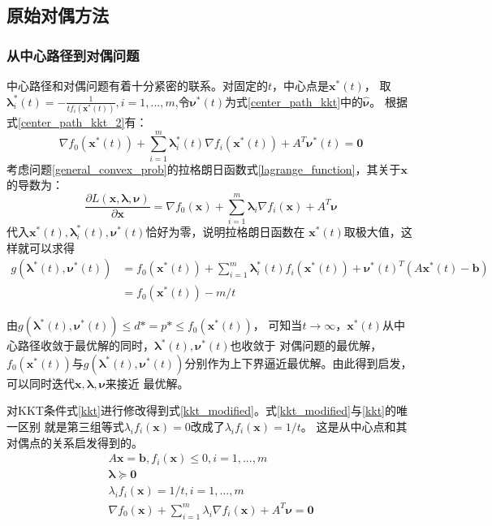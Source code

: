 \documentclass{article}
\begin{document}
\subsection{原始对偶方法}
\subsubsection{从中心路径到对偶问题}
\label{center_to_dual}
中心路径和对偶问题有着十分紧密的联系。对固定的$t$，中心点是$\bm x^*(t)$，
取$\bm\lambda_i^*(t)=-\frac{1}{tf_i(\bm x^*(t))},i=1,...,m$,令$\bm \nu^*(t)$为式\eqref{center_path_kkt}中的$\widehat{\bm\nu}$。
根据式\eqref{center_path_kkt_2}有：
$$\nabla f_0(\bm x^*(t))+\sum_{i=1}^m{\bm\lambda_i^*(t)\nabla f_i(\bm x^*(t))}+A^T\bm \nu^*(t)=\bm 0$$
考虑问题\ref{general_convex_prob}的拉格朗日函数式\eqref{lagrange_function}，其关于$\bm x$的导数为：
$$\frac{\partial L(\bm x,\bm \lambda,\bm \nu)}{\partial\bm x}=
\nabla f_0(\bm x)+\sum_{i=1}^m{\bm\lambda_i\nabla f_i(\bm x)}+A^T\bm\nu$$
代入$\bm x^*(t),\bm\lambda_i^*(t),\bm\nu^*(t)$恰好为零，说明拉格朗日函数在
$\bm x^*(t)$取极大值，这样就可以求得
\begin{equation}
    \label{dual_margin}
    \begin{aligned}
    g(\bm\lambda^*(t),\bm\nu^*(t))&=f_0(\bm x^*(t))+\sum_{i=1}^m{\bm\lambda_i^*(t)f_i(\bm x^*(t))}+\bm\nu^*(t)^T(A\bm x^*(t)-\bm b)\\
    &=f_0(\bm x^*(t))-m/t
    \end{aligned}
\end{equation}

由$g(\bm\lambda^*(t),\bm\nu^*(t))\le d*=p*\le f_0(\bm x^*(t))$，
可知当$t\rightarrow\infty$，$\bm x^*(t)$从中心路径收敛于最优解的同时，$\bm\lambda^*(t),\bm\nu^*(t)$也收敛于
对偶问题的最优解，$f_0(\bm x^*(t))$与$g(\bm\lambda^*(t),\bm\nu^*(t))$分别作为上下界逼近最优解。由此得到启发，可以同时迭代$\bm x,\bm\lambda,\bm\nu$来接近
最优解。

对KKT条件式\eqref{kkt}进行修改得到式\eqref{kkt_modified}。式\eqref{kkt_modified}与\eqref{kkt}的唯一区别
就是第三组等式$\lambda_if_i(\bm x)=0$改成了$\lambda_if_i(\bm x)=1/t$。
这是从中心点和其对偶点的关系启发得到的。
\begin{equation}
    \label{kkt_modified}
    \begin{gathered}
    A\bm x=\bm b,f_i(\bm x)\le 0,i=1,...,m \\
    \bm\lambda\succeq \bm 0 \\
    \lambda_if_i(\bm x)=1/t,i=1,...,m\\
    \nabla f_0(\bm x)+\sum_{i=1}^m{\lambda_i}\nabla f_i(\bm x)+A^T\bm\nu=\bm 0\\
    \end{gathered}
\end{equation}
\end{document}

